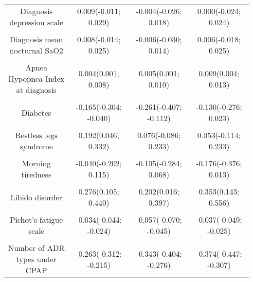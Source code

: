 \documentclass[../matsup.tex]{subfiles}
\begin{document}
\begin{longtable}[t]{cccc}
Diagnosis depression scale & 0.009(-0.011; 0.029) & -0.004(-0.026; 0.018) & 0.000(-0.024; 0.024)\\
\cellcolor{gray!6}{Diagnosis micro awake index} & \cellcolor{gray!6}{-0.001(-0.004; 0.003)} & \cellcolor{gray!6}{0.006(0.002; 0.010)} & \cellcolor{gray!6}{0.003(-0.001; 0.007)}\\
Diagnosis mean nocturnal SaO2 & 0.008(-0.014; 0.025) & -0.006(-0.030; 0.014) & 0.006(-0.018; 0.025)\\
\cellcolor{gray!6}{Diagnosis delay between visit and sleep examination} & \cellcolor{gray!6}{0.000(-0.000; 0.000)} & \cellcolor{gray!6}{0.000(-0.000; 0.000)} & \cellcolor{gray!6}{0.000(-0.000; 0.000)}\\
Apnea Hypopnea Index at diagnosis & 0.004(0.001; 0.008) & 0.005(0.001; 0.010) & 0.009(0.004; 0.013)\\
\cellcolor{gray!6}{Gender (male)} & \cellcolor{gray!6}{0.086(-0.071; 0.248)} & \cellcolor{gray!6}{-0.033(-0.217; 0.159)} & \cellcolor{gray!6}{-0.222(-0.408; -0.027)}\\
Diabetes & -0.165(-0.304; -0.040) & -0.261(-0.407; -0.112) & -0.130(-0.276; 0.023)\\
\cellcolor{gray!6}{Hypercholesterolemia} & \cellcolor{gray!6}{0.050(-0.080; 0.178)} & \cellcolor{gray!6}{0.088(-0.061; 0.231)} & \cellcolor{gray!6}{0.114(-0.033; 0.263)}\\
Restless legs syndrome & 0.192(0.046; 0.332) & 0.076(-0.086; 0.233) & 0.053(-0.114; 0.233)\\
\cellcolor{gray!6}{Daytime sleepiness} & \cellcolor{gray!6}{-0.096(-0.258; 0.064)} & \cellcolor{gray!6}{-0.060(-0.240; 0.117)} & \cellcolor{gray!6}{-0.177(-0.371; 0.000)}\\
Morning tiredness & -0.040(-0.202; 0.115) & -0.105(-0.284; 0.068) & -0.176(-0.376; 0.013)\\
\cellcolor{gray!6}{Morning headaches} & \cellcolor{gray!6}{0.054(-0.111; 0.217)} & \cellcolor{gray!6}{0.081(-0.112; 0.276)} & \cellcolor{gray!6}{-0.025(-0.226; 0.173)}\\
Libido disorder & 0.276(0.105; 0.440) & 0.202(0.016; 0.397) & 0.353(0.143; 0.556)\\
\cellcolor{gray!6}{Night sweating} & \cellcolor{gray!6}{-0.051(-0.203; 0.111)} & \cellcolor{gray!6}{-0.104(-0.285; 0.062)} & \cellcolor{gray!6}{-0.234(-0.437; -0.051)}\\
Pichot's fatigue scale & -0.034(-0.044; -0.024) & -0.057(-0.070; -0.045) & -0.037(-0.049; -0.025)\\
\cellcolor{gray!6}{Average pressure of CPAP} & \cellcolor{gray!6}{0.055(0.030; 0.081)} & \cellcolor{gray!6}{0.076(0.048; 0.105)} & \cellcolor{gray!6}{0.116(0.085; 0.144)}\\
Number of ADR types under CPAP & -0.263(-0.312; -0.215) & -0.343(-0.404; -0.276) & -0.374(-0.447; -0.307)\\*
\end{longtable}
\endgroup{}
\clearpage
\begingroup\fontsize{7}{9}\selectfont
\end{document}
